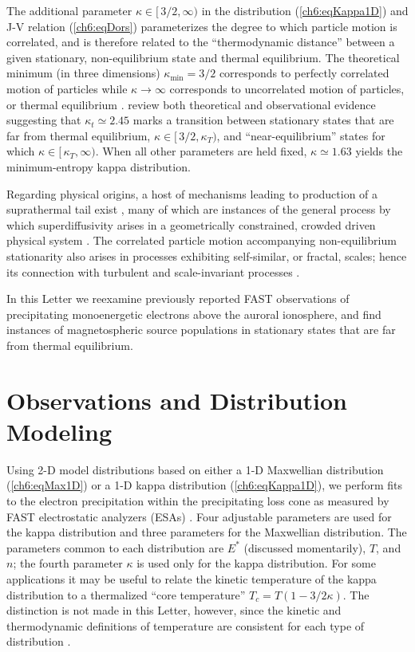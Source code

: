  The additional parameter $\kappa \in [ \, 3/2, \infty )$ in the
 distribution (\ref{ch6:eqKappa1D}) and J-V relation
 (\ref{ch6:eqDors}) parameterizes the degree to which particle motion
 is correlated, and is therefore related to the ``thermodynamic
 distance'' between a given stationary, non-equilibrium state and
 thermal equilibrium. The theoretical minimum (in three dimensions)
 $\kappa_{\textrm{min}} = 3/2$ corresponds to perfectly correlated
 motion of particles while $\kappa \rightarrow \infty$ corresponds to
 uncorrelated motion of particles, or thermal equilibrium
 \citep{Livadiotis2010,Livadiotis2011,Livadiotis2013}. \citet{Livadiotis2010}
 review both theoretical and observational evidence suggesting that
 $\kappa_t \simeq 2.45$ marks a transition between stationary states
 that are far from thermal equilibrium, $\kappa \in [ \, 3/2, \kappa_T
 )$, and ``near-equilibrium'' states for which $\kappa \in [ \,
 \kappa_T, \infty )$. When all other parameters are held fixed,
 $\kappa \simeq 1.63$ yields the minimum-entropy kappa distribution.

 Regarding physical origins, a host of mechanisms leading to
 production of a suprathermal tail exist \citep[e.g., review
 by][]{Pierrard2010}, many of which are instances of the general
 process by which superdiffusivity arises in a geometrically
 constrained, crowded driven physical system \citep{Benichou2013}.
 The correlated particle motion accompanying non-equilibrium
 stationarity also arises in processes exhibiting self-similar, or
 fractal, scales; hence its connection with turbulent and
 scale-invariant processes \citep{West1990,Treumann1999a,Leubner2004}.

 In this Letter we reexamine previously reported FAST observations of
 precipitating monoenergetic electrons above the auroral ionosphere,
 and find instances of magnetospheric source populations in stationary
 states that are far from thermal equilibrium.

  \section{Observations and Distribution Modeling}

  Using 2-D model distributions based on either a 1-D Maxwellian
  distribution (\ref{ch6:eqMax1D}) or a 1-D kappa distribution
  (\ref{ch6:eqKappa1D}), we perform fits to the electron precipitation
  within the precipitating loss cone as measured by FAST electrostatic
  analyzers (ESAs) \citep{Carlson2001}. Four adjustable parameters are
  used for the kappa distribution and three parameters for the
  Maxwellian distribution. The parameters common to each distribution
  are $E^*$ (discussed momentarily), $T$, and $n$; the fourth
  parameter $\kappa$ is used only for the kappa distribution. For some
  applications \citep[e.g.,][]{Sutherland2012} it may be useful to
  relate the kinetic temperature of the kappa distribution to a
  thermalized ``core temperature'' $T_c = T (1-3/2 \kappa)$. The
  distinction is not made in this Letter, however, since the kinetic
  and thermodynamic definitions of temperature are consistent for each
  type of distribution \citep{Livadiotis2010}.

